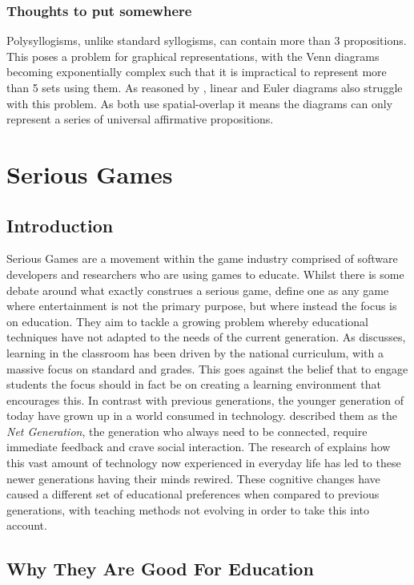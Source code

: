 \documentclass[12pt,a4paper]{report}
\begin{document}
\subsection{Thoughts to put somewhere}
Polysyllogisms, unlike standard syllogisms, can contain more than 3 propositions. This poses a problem for graphical representations, with the Venn diagrams becoming exponentially complex such that it is impractical to represent more than 5 sets using them.
As reasoned by \cite{cheng2014graphical}, linear and Euler diagrams also struggle with this problem. As both use spatial-overlap it means the diagrams can only represent a series of universal affirmative propositions. 

\chapter{Serious Games}
\section{Introduction}
Serious Games are a movement within the game industry comprised of software developers and researchers who are using games to educate. Whilst there is some debate around what exactly construes a serious game, \cite{michael2005serious} define one as any game where entertainment is not the primary purpose, but where instead the focus is on education. They aim to tackle a growing problem whereby educational techniques have not adapted to the needs of the current generation. As \cite{lim2008spirit} discusses, learning in the classroom has been driven by the national curriculum, with a massive focus on standard and grades. This goes against the belief that to engage students the focus should in fact be on creating a learning environment that encourages this.  In contrast with previous generations, the younger generation of today have grown up in a world consumed in technology. \cite{oblinger2005educating} described them as the \textit{Net Generation}, the generation who always need to be connected, require immediate feedback and crave social interaction. The research of \cite{prensky2001games} explains how this vast amount of technology now experienced in everyday life has led to these newer generations having their minds rewired. These cognitive changes have caused a different set of educational preferences when compared to previous generations, with teaching methods not evolving in order to take this into account.

\section{Why They Are Good For Education}
\end{document}
